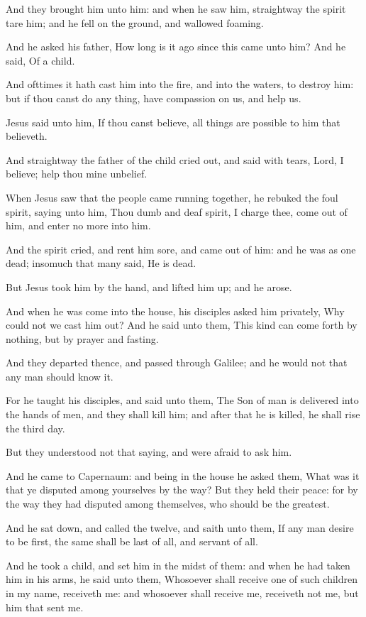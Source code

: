 \verse And they brought him unto him: and when he saw him, straightway the spirit tare him; and he fell on the ground, and wallowed foaming.

\verse And he asked his father, How long is it ago since this came unto him?  And he said, Of a child.

\verse And ofttimes it hath cast him into the fire, and into the waters, to destroy him: but if thou canst do any thing, have compassion on us, and help us.

\verse Jesus said unto him, If thou canst believe, all things are possible to him that believeth.

\verse And straightway the father of the child cried out, and said with tears, Lord, I believe; help thou mine unbelief.

\verse When Jesus saw that the people came running together, he rebuked the foul spirit, saying unto him, Thou dumb and deaf spirit, I charge thee, come out of him, and enter no more into him.

\verse And the spirit cried, and rent him sore, and came out of him: and he was as one dead; insomuch that many said, He is dead.

\verse But Jesus took him by the hand, and lifted him up; and he arose.

\verse And when he was come into the house, his disciples asked him privately, Why could not we cast him out?  \verse And he said unto them, This kind can come forth by nothing, but by prayer and fasting.

\verse And they departed thence, and passed through Galilee; and he would not that any man should know it.

\verse For he taught his disciples, and said unto them, The Son of man is delivered into the hands of men, and they shall kill him; and after that he is killed, he shall rise the third day.

\verse But they understood not that saying, and were afraid to ask him.

\verse And he came to Capernaum: and being in the house he asked them, What was it that ye disputed among yourselves by the way?  \verse But they held their peace: for by the way they had disputed among themselves, who should be the greatest.

\verse And he sat down, and called the twelve, and saith unto them, If any man desire to be first, the same shall be last of all, and servant of all.

\verse And he took a child, and set him in the midst of them: and when he had taken him in his arms, he said unto them, \verse Whosoever shall receive one of such children in my name, receiveth me: and whosoever shall receive me, receiveth not me, but him that sent me.

